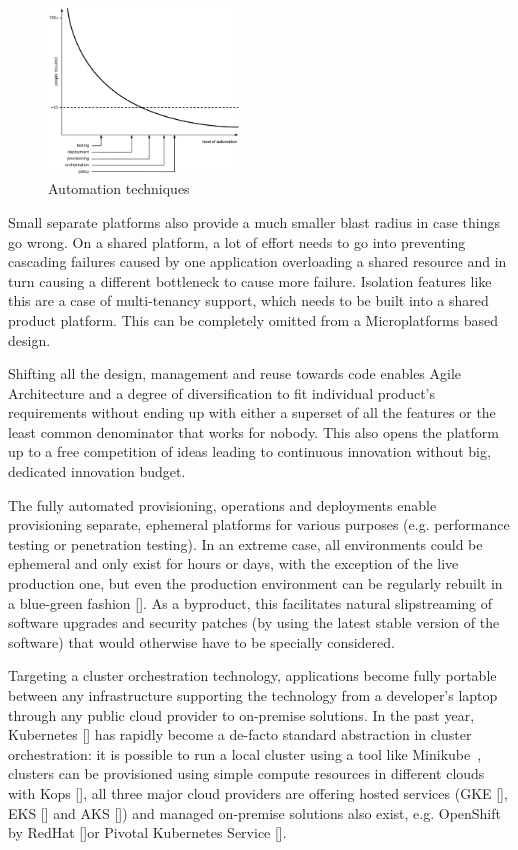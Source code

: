 \documentclass[reprint,amsmath,amssymb,aps]{revtex4-1}
\begin{document}
\begin{figure}[h]
	\includegraphics[width=0.45\textwidth]{figs/automation-tools}
	\caption{Automation techniques}
	\label{fig:automation-techniques}
\end{figure}

Small separate platforms also provide a much smaller blast radius in case things go wrong. On a shared platform, a lot of effort needs to go into preventing cascading failures caused by one application overloading a shared resource and in turn causing a different bottleneck to cause more failure. Isolation features like this are a case of multi-tenancy support, which needs to be built into a shared product platform. This can be completely omitted from a Microplatforms based design.

Shifting all the design, management and reuse towards code enables Agile Architecture and a degree of diversification to fit individual product’s requirements without ending up with either a superset of all the features or the least common denominator that works for nobody. This also opens the platform up to a free competition of ideas leading to continuous innovation without big, dedicated innovation budget.

The fully automated provisioning, operations and deployments enable provisioning separate, ephemeral platforms for various purposes (e.g. performance testing or penetration testing). In an extreme case, all environments could be ephemeral and only exist for hours or days, with the exception of the live production one, but even the production environment can be regularly rebuilt in a blue-green fashion []. As a byproduct, this facilitates natural slipstreaming of software upgrades and security patches (by using the latest stable version of the software) that would otherwise have to be specially considered.

Targeting a cluster orchestration technology, applications become fully portable between any infrastructure supporting the technology from a developer’s laptop through any public cloud provider to on-premise solutions. In the past year, Kubernetes [] has rapidly become a de-facto standard abstraction in cluster orchestration: it is possible to run a local cluster using a tool like Minikube~\cite{RunningK70:online}, clusters can be provisioned using simple compute resources in different clouds with Kops [], all three major cloud providers are offering hosted services (GKE [], EKS [] and AKS []) and managed on-premise solutions also exist, e.g. OpenShift by RedHat []or Pivotal Kubernetes Service [].
\end{document}
